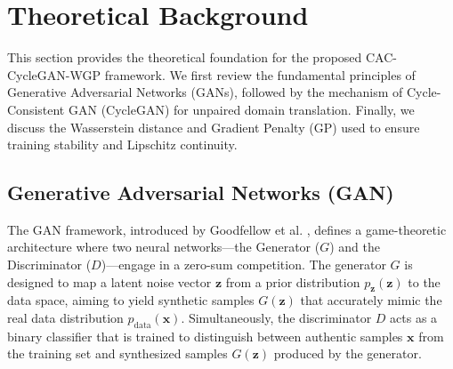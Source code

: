 \section{Theoretical Background}
\label{sec:background}

This section provides the theoretical foundation for the proposed CAC-CycleGAN-WGP framework. We first review the fundamental principles of Generative Adversarial Networks (GANs), followed by the mechanism of Cycle-Consistent GAN (CycleGAN) for unpaired domain translation. Finally, we discuss the Wasserstein distance and Gradient Penalty (GP) used to ensure training stability and Lipschitz continuity.

\subsection{Generative Adversarial Networks (GAN)}
The GAN framework, introduced by Goodfellow et al. \cite{goodfellow2014gan}, defines a game-theoretic architecture where two neural networks—the Generator ($G$) and the Discriminator ($D$)—engage in a zero-sum competition. The generator $G$ is designed to map a latent noise vector $\boldsymbol{z}$ from a prior distribution $p_{\boldsymbol{z}}(\boldsymbol{z})$ to the data space, aiming to yield synthetic samples $G(\boldsymbol{z})$ that accurately mimic the real data distribution $p_{\text{data}}(\boldsymbol{x})$. Simultaneously, the discriminator $D$ acts as a binary classifier that is trained to distinguish between authentic samples $\boldsymbol{x}$ from the training set and synthesized samples $G(\boldsymbol{z})$ produced by the generator.

